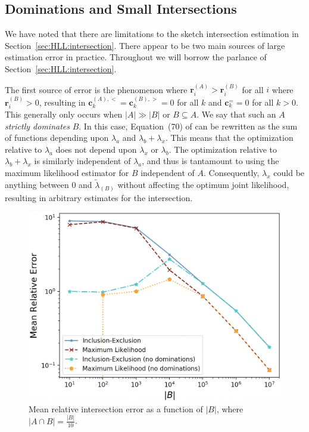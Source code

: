 \documentclass{vldb}
\begin{document}
\begin{appendix}
\section{Dominations and Small Intersections}
 \label{apdx:intersections}

We have noted that there are limitations to the sketch intersection estimation in Section~\ref{sec:HLL:intersection}.
There appear to be two main sources of large estimation error in practice.
Throughout we will borrow the parlance of Section~\ref{sec:HLL:intersection}.

The first source of error is the phenomenon where $\mathbf{r}^{(A)}_i > \mathbf{r}^{(B)}_i$ for all $i$ where $\mathbf{r}^{(B)}_i > 0$, resulting in  $\mathbf{c}^{(A),<}_k = \mathbf{c}^{(B),>}_k = 0$ for all $k$ and $\mathbf{c}^{=}_k = 0$ for all $k > 0$. 
This generally only occurs when $|A| \gg |B|$ or $B \subseteq A$.
We say that such an $A$ \emph{strictly dominates} $B$. 
In this case, Equation~(70) of \cite{ertl2017new} can be rewritten as the sum of functions depending upon $\lambda_a$ and $\lambda_b + \lambda_x$. 
This means that the optimization relative to $\lambda_a$ does not depend upon $\lambda_x$ or $\lambda_b$.
The optimization relative to $\lambda_b + \lambda_x$ is similarly independent of $\lambda_a$, and thus is tantamount to using the maximum likelihood estimator for $B$ independent of $A$. 
Consequently, $\lambda_x$ could be anything between 0 and $\widetilde{\lambda}_{(B)}$ without affecting the optimum joint likelihood, resulting in arbitrary estimates for the intersection.

\begin{figure}[t]
\centering
\includegraphics[width=0.8\columnwidth]{B_size_vs_relative_error_tenth_intersection}
\caption{Mean relative intersection error as a function of $|B|$, where $|A \cap B| = \frac{|B|}{10}$.
}
\label{fig:domination}
\end{figure}


\end{appendix}
\end{document}
